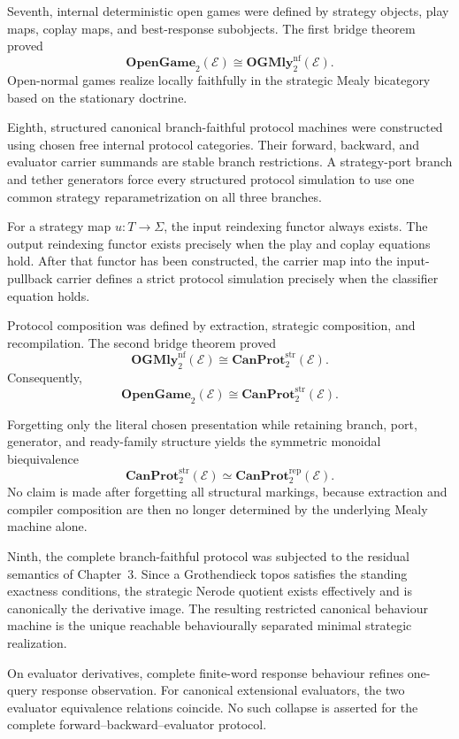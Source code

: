 Seventh, internal deterministic open games were defined by strategy objects, play maps, coplay maps,
and best-response subobjects. The first bridge theorem proved
\[
  \boxed{
  \mathbf{OpenGame}_2(\mathcal E)
  \cong
  \mathbf{OGMly}^{\mathrm{nf}}_2(\mathcal E).
  }
\]
Open-normal games realize locally faithfully in the strategic Mealy bicategory based on the
stationary doctrine.

Eighth, structured canonical branch-faithful protocol machines were constructed using chosen free
internal protocol categories. Their forward, backward, and evaluator carrier summands are stable
branch restrictions. A strategy-port branch and tether generators force every structured protocol
simulation to use one common strategy reparametrization on all three branches.

For a strategy map \(u:T\to\Sigma\), the input reindexing functor always exists. The output
reindexing functor exists precisely when the play and coplay equations hold. After that functor has
been constructed, the carrier map into the input-pullback carrier defines a strict protocol
simulation precisely when the classifier equation holds.

Protocol composition was defined by extraction, strategic composition, and recompilation. The
second bridge theorem proved
\[
  \boxed{
  \mathbf{OGMly}^{\mathrm{nf}}_2(\mathcal E)
  \cong
  \mathbf{CanProt}^{\mathrm{str}}_2(\mathcal E).
  }
\]
Consequently,
\[
  \boxed{
  \mathbf{OpenGame}_2(\mathcal E)
  \cong
  \mathbf{CanProt}^{\mathrm{str}}_2(\mathcal E).
  }
\]

Forgetting only the literal chosen presentation while retaining branch, port, generator, and
ready-family structure yields the symmetric monoidal biequivalence
\[
  \mathbf{CanProt}^{\mathrm{str}}_2(\mathcal E)
  \simeq
  \mathbf{CanProt}^{\mathrm{rep}}_2(\mathcal E).
\]
No claim is made after forgetting all structural markings, because extraction and compiler
composition are then no longer determined by the underlying Mealy machine alone.

Ninth, the complete branch-faithful protocol was subjected to the residual semantics of Chapter~3.
Since a Grothendieck topos satisfies the standing exactness conditions, the strategic Nerode quotient
exists effectively and is canonically the derivative image. The resulting restricted canonical
behaviour machine is the unique reachable behaviourally separated minimal strategic realization.

On evaluator derivatives, complete finite-word response behaviour refines one-query response
observation. For canonical extensional evaluators, the two evaluator equivalence relations coincide.
No such collapse is asserted for the complete forward--backward--evaluator protocol.

